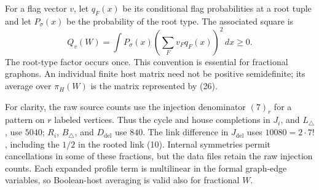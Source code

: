 \documentclass[11pt]{amsart}
\theoremstyle{definition}
\theoremstyle{remark}
\begin{document}
For a flag vector \(v\), let \(q_F(x)\) be its conditional flag
probabilities at a root tuple and let \(P_\sigma(x)\) be the probability
of the root type. The associated square is
\begin{equation}
 Q_v(W)=\int P_\sigma(x)\left(\sum_Fv_Fq_F(x)\right)^2\,dx\ge0.\tag{26}
\end{equation}
The root-type factor occurs once. This convention is essential for
fractional graphons. An individual finite host matrix need not be positive
semidefinite; its average over \(\pi_H(W)\) is the matrix represented by
(26).

For clarity, the raw source counts use the injection denominator \((7)_r\)
for a pattern on \(r\) labeled vertices. Thus the cycle and house
completions in \(J_i\), and \(L_\triangle\), use \(5040\);
\(R_i\), \(B_\triangle\), and \(D_{\mathrm{del}}\) use \(840\).
The link difference in \(J_{\mathrm{del}}\) uses
\(10080=2\cdot7!\), including the \(1/2\) in the rooted link (10).
Internal symmetries permit cancellations in some of these fractions, but
the data files retain the raw injection counts. Each expanded profile term
is multilinear in the formal graph-edge variables, so Boolean-host
averaging is valid also for fractional \(W\).
\end{document}
